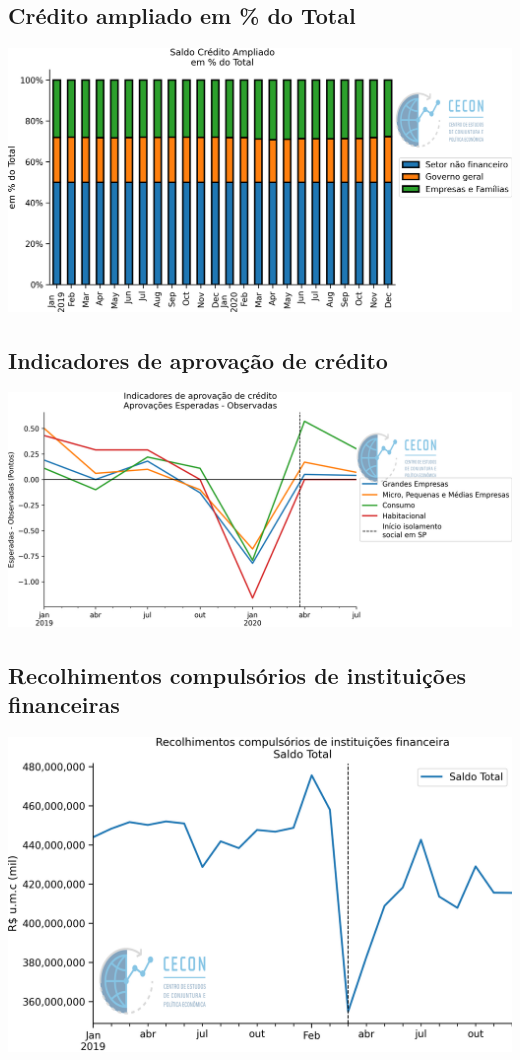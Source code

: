 \documentclass{SelfArx}
\begin{document}
\subsection*{Crédito ampliado em \% do Total}
\label{sec:orga6cfeca}

\begin{center}
\includegraphics[width=.9\linewidth]{./figs/Credito/SaldoCreditoAmpliado_Total.png}
\end{center}

\subsection*{Indicadores de aprovação de crédito}
\label{sec:orgadcaa9b}

\begin{center}
\includegraphics[width=.9\linewidth]{./figs/Credito/PTC.png}
\end{center}

\subsection*{Recolhimentos compulsórios de instituições financeiras}
\label{sec:org76fef48}

\begin{center}
\includegraphics[width=.9\linewidth]{./figs/Credito/Recolhimentos_Total.png}
\end{center}
\end{document}
